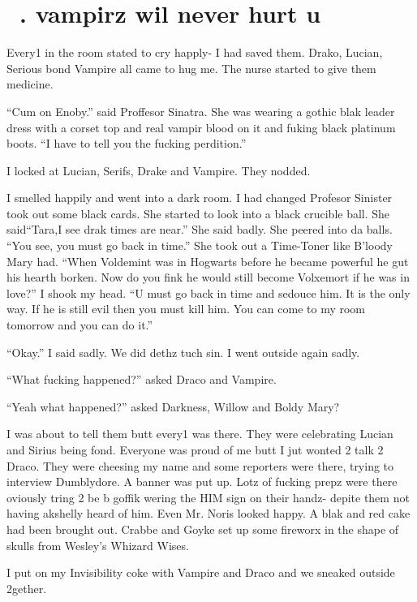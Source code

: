 \section{\chaptername~\thesection. vampirz wil never hurt u}



Every1 in the room stated to cry happly- I had saved them. Drako, Lucian, Serious bond Vampire all came to hug me. The nurse started to give them medicine.

\enquote{Cum on Enoby.} said Proffesor Sinatra. She was wearing a gothic blak leader dress with a corset top and real vampir blood on it and fuking black platinum boots. \enquote{I have to tell you the fucking perdition.}

I locked at Lucian, Serifs, Drake and Vampire. They nodded.

I smelled happily and went into a dark room. I had changed Profesor Sinister took out some black cards. She started to look into a black crucible ball. She said\dotfill \enquote{Tara,\newline I see drak times are near.} She said badly. She peered into da balls. \enquote{You see, you must go back in time.} She took out a Time-Toner like B'loody Mary had. \enquote{When Voldemint was in Hogwarts before he became powerful he gut his hearth borken. Now do you fink he would still become Volxemort if he was in love?} I shook my head. \enquote{U must go back in time and sedouce him. It is the only way. If he is still evil then you must kill him. You can come to my room tomorrow and you can do it.}

\enquote{Okay.} I said sadly. We did dethz tuch sin. I went outside again sadly.

\enquote{What fucking happened?} asked Draco and Vampire.

\enquote{Yeah what happened?} asked Darkness, Willow and Boldy Mary?

I was about to tell them butt every1 was there. They were celebrating Lucian and Sirius being fond. Everyone was proud of me butt I jut wonted 2 talk 2 Draco. They were cheesing my name and some reporters were there, trying to interview Dumblydore. A banner was put up. Lotz of fucking prepz were there oviously tring 2 be b goffik wering the HIM sign on their handz- depite them not having akshelly heard of him. Even Mr. Noris looked happy. A blak and red cake had been brought out. Crabbe and Goyke set up some fireworx in the shape of skulls from Wesley's Whizard Wises.

I put on my Invisibility coke with Vampire and Draco and we sneaked outside 2gether.

